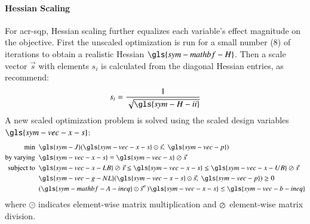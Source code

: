 \paragraph{Hessian Scaling}
For \gls{acr-sqp}, Hessian scaling further equalizes each variable's effect magnitude on the objective.
First the unscaled optimization is run for a small number (8) of iterations to obtain a realistic Hessian $\gls{sym-mathbf-H}$.
Then a scale vector $\vec{s}$ with elements $s_i$ is calculated from the diagonal Hessian entries, as \citet[section 8.3]{papalambros_principles_2017} recommend:
\begin{equation}
    s_i = \frac{1}{\sqrt{\gls{sym-H-ii}}}
\end{equation}
A new scaled optimization problem is solved using the scaled design variables $\gls{sym-vec-x-s}$:
\begin{equation}
\begin{aligned}
    \text{min}~~& \gls{sym-J}(\gls{sym-vec-x-s} \odot \vec{s},~\gls{sym-vec-p}) \\
    \text{by varying}~~&\gls{sym-vec-x-s}= \gls{sym-vec-x} \varoslash \vec{s}\\
    \text{subject to}~~ &\gls{sym-vec-x-LB}\varoslash \vec{s} \leq \gls{sym-vec-x-s} \leq \gls{sym-vec-x-UB} \varoslash \vec{s}\\
    &\gls{sym-vec-g-NL}(\gls{sym-vec-x-s}\odot\vec{s},~\gls{sym-vec-p}) \geq 0\\
    & (\gls{sym-mathbf-A-ineq} \odot \vec{s}^{\top})\gls{sym-vec-x-s} \leq \gls{sym-vec-b-ineq}
    \label{remdo:eq:scaled-standard}
\end{aligned}
\end{equation}
where $\odot$ indicates element-wise matrix multiplication and $\varoslash$ element-wise matrix division.

